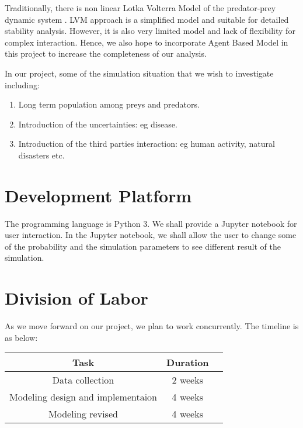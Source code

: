 \documentclass{article}
\begin{document}
\begin{normalsize}
		Traditionally, there is non linear Lotka Volterra Model of the predator-prey dynamic system \cite{inproceedings, 1102729}. LVM approach is a simplified model and suitable for detailed stability analysis. However, it is also very limited model and lack of flexibility for complex interaction. Hence, we also hope to incorporate Agent Based Model \cite{Hodzic} in this project to increase the completeness of our analysis. 
		
		In our project, some of the simulation situation that we wish to investigate including:
		\begin{enumerate}
			\item Long term population among preys and predators.
			\item Introduction of the uncertainties: eg disease.
			\item Introduction of the third parties interaction: eg human activity, natural disasters etc.
		\end{enumerate}
		
		\section{Development Platform}
		The programming language is Python 3. We shall provide a Jupyter notebook for user interaction.
		In the Jupyter notebook, we shall allow the user to change some of the probability and the simulation parameters to see different result of the simulation.
		
		\section{Division of Labor}
		As we move forward on our project, we plan to work concurrently. The timeline is as below:
		
		\begin{center}
			\begin{tabular}{ |c|c|c| } 
				\hline
				Task & Duration  \\ 
				\hline
				Data collection & 2 weeks \\ 
				Modeling design and implementaion & 4 weeks \\ 
				Modeling revised & 4 weeks \\ 
				\hline
			\end{tabular}
		\end{center}
		

		
		
		
	\end{normalsize}
	
\end{document}

